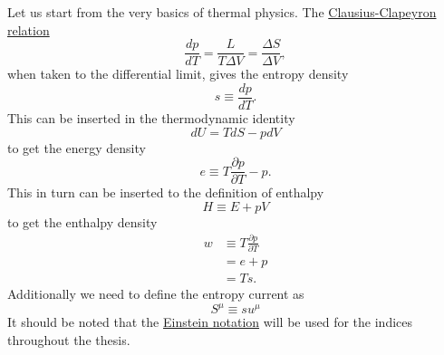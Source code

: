Let us start from the very basics of thermal physics.
The
\href{https://en.wikipedia.org/wiki/Clausius\%E2\%80\%93Clapeyron_relation}{Clausius-Clapeyron relation}
\cite[eq. 5.47, 5.48]{schroeder_thermal_2000}
\begin{equation}
\frac{dp}{dT} = \frac{L}{T \Delta V} = \frac{\Delta S}{\Delta V},
\end{equation}
when taken to the differential limit, gives the entropy density
\cite[p. 23]{lecture_notes}
\begin{equation}
s \equiv \frac{dp}{dT}.
\end{equation}
This can be inserted in the thermodynamic identity
\cite[eq. 3.46]{schroeder_thermal_2000}
\begin{equation}
dU = TdS - pdV
\end{equation}
to get the energy density
\begin{equation}
e \equiv T \frac{\partial p}{\partial T} - p.
\end{equation}
This in turn can be inserted to the definition of enthalpy
\cite[eq. 1.51]{schroeder_thermal_2000}
\begin{equation}
H \equiv E + pV
\end{equation}
to get the enthalpy density
\begin{align}
w
&\equiv T \frac{\partial p}{\partial T} \\
&= e+p \\
&= Ts.
\end{align}
Additionally we need to define the entropy current as
\cite[p. 23]{lecture_notes}
\begin{equation}
S^\mu \equiv su^\mu
\end{equation}
It should be noted that the
\href{https://en.wikipedia.org/wiki/Einstein_notation}{Einstein notation} will be used for the indices throughout the thesis.

